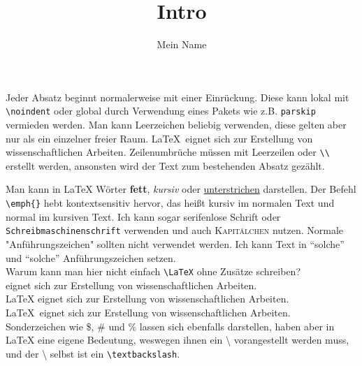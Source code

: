 \documentclass[11pt,a4paper]{article}
\title{Intro}
\author{Mein Name}
\begin{document}
\maketitle %

Jeder Absatz beginnt normalerweise mit einer Einrückung.
Diese kann lokal mit \verb|\noindent| oder global
durch Verwendung eines Pakets wie z.B. \verb|parskip| vermieden werden.
Man kann Leerzeichen     beliebig     verwenden,
diese gelten aber nur als ein einzelner freier Raum.
\LaTeX\ eignet sich zur Erstellung von wissenschaftlichen Arbeiten.
Zeilenumbrüche müssen mit Leerzeilen oder \verb|\\| erstellt werden,
ansonsten wird der Text zum bestehenden Absatz gezählt.

Man kann in \LaTeX{} Wörter \textbf{fett}, \textit{kursiv} oder \underline{unterstrichen} darstellen.
Der Befehl \verb|\emph{}| hebt kontextsensitiv hervor,
das heißt kursiv im normalen Text und normal im kursiven Text.
Ich kann sogar \textsf{serifenlose Schrift} oder \texttt{Schreibmaschinenschrift} verwenden
und auch \textsc{Kapitälchen} nutzen. Normale "Anführungszeichen" sollten nicht verwendet werden.
Ich kann Text in "`solche"' und ``solche'' Anführungszeichen setzen.\\

\noindent Warum kann man hier nicht einfach \verb|\LaTeX| ohne Zusätze schreiben?\\

\noindent{\LaTeX } eignet sich zur Erstellung von wissenschaftlichen Arbeiten.\\
\noindent\LaTeX{} eignet sich zur Erstellung von wissenschaftlichen Arbeiten.\\
\noindent\LaTeX\ eignet sich zur Erstellung von wissenschaftlichen Arbeiten.\\

Sonderzeichen wie \$, \# und \% lassen sich ebenfalls darstellen,
haben aber in \LaTeX{} eine eigene Bedeutung,
weswegen ihnen ein \textbackslash{} vorangestellt werden muss,
und der \textbackslash{} selbst ist ein \verb|\textbackslash|.
\end{document}
